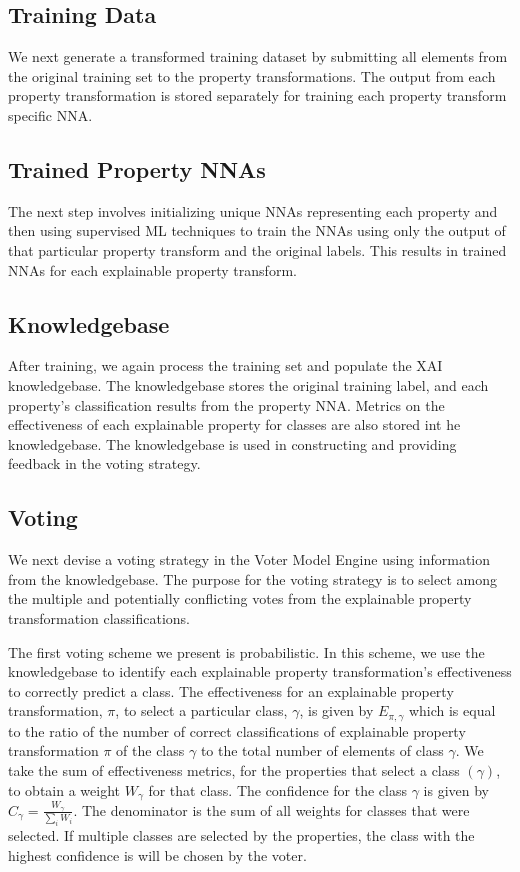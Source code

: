 \documentclass[conference]{IEEEtran}
\begin{document}
\subsection{Training Data} 
We next generate a transformed training dataset by submitting all elements from the original training set to the property transformations.  The output from each property transformation is stored separately for training each property transform specific NNA. 

\subsection{Trained Property NNAs}
The next step involves initializing unique NNAs representing each property and then using supervised ML techniques to train the NNAs using only the output of that particular property transform and the original labels.  This results in trained NNAs for each explainable property transform.

\subsection{Knowledgebase}
After training, we again process the training set and populate the XAI knowledgebase.  The knowledgebase stores the original training label, and each property's classification results from the property NNA.  Metrics on the effectiveness of each explainable property for classes are also stored int he knowledgebase.  The knowledgebase is used in constructing and providing feedback in the voting strategy. 

\subsection{Voting}
We next devise a voting strategy in the Voter Model Engine using information from the knowledgebase.  The purpose for the voting strategy is to select among the multiple and potentially conflicting votes from the explainable property transformation classifications.

The first voting scheme we present is probabilistic.  In this scheme, we use the knowledgebase to identify each explainable property transformation's effectiveness to correctly predict a class.   The effectiveness for an explainable property transformation, $\pi$, to select a particular class, $\gamma$,  is given by $E_{\pi,\gamma}$ which is equal to the ratio of the number of correct classifications of explainable property transformation $\pi$ of the class $\gamma$ to the total number of elements of class $\gamma$.   We take the sum of effectiveness metrics, for the properties that select a class $(\gamma)$, to obtain a weight $W_\gamma$ for that class.  The confidence for the class $\gamma$ is given by $C_\gamma=\frac{W_\gamma}{\sum\limits_iW_i}$.  The denominator is the sum of all weights for classes that were selected.  If multiple classes are selected by the properties, the class with the highest confidence is will be chosen by the voter.
\end{document}

